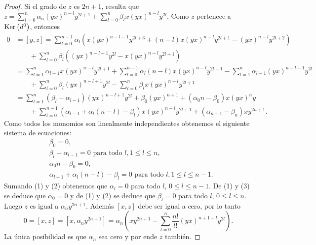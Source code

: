 \documentclass[fleqn,../tesis.tex]{subfiles}
\begin{document}
\begin{proof}
    Si el grado de $z$ es $2n + 1$, resulta que
    $z = \sum_{l = 0}^{n}\alpha_n (yx)^{n - l}y^{2l + 1} + \sum_{l = 0}^{n}\beta_l x (yx)^{n - l}y^{2l}$.
    Como $z$ pertenece a $\operatorname{Ker}\left(d^{0}\right)$, entonces
    \begin{align*}
        0 &= [y,z] = \sum_{l = 0}^{n - 1}\alpha_l \left(x (yx)^{n - l - 1}y^{2l + 3}
            + (n - l)x(yx)^{n - l}y^{2l + 1} - (yx)^{n - l}y^{2l + 2}\right) \\
        &\qquad + \sum_{l = 0}^{n}\beta_l\left((yx)^{n - l + 1}y^{2l} - x(yx)^{n - l}y^{2l + 1}\right)\\
        & = \sum_{l = 1}^{n}\alpha_{l - 1} x (yx)^{n - l}y^{2l + 1} + \sum_{l = 0}^{n - 1}\alpha_l (n - l)x(yx)^{n - l}y^{2l + 1}
           -\sum_{l = 1}^{n}\alpha_{l - 1}(yx)^{n - l + 1}y^{2l}\\
        &\qquad + \sum_{l = 0}^{n}\beta_l (yx)^{n - l + 1}y^{2l} -\sum_{l = 0}^{n}\beta_l x(yx)^{n - l}y^{2l + 1} \\
        &= \sum_{l = 1}^{n}\left(\beta_l - \alpha_{l - 1}\right)(yx)^{n - l + 1}y^{2l} + \beta_0 (yx)^{n + 1}
            + \left(\alpha_0 n - \beta_0\right)x(yx)^{n}y\\
        &\qquad + \sum_{l = 0}^{n - 1}\left(\alpha_{l - 1} + \alpha_l(n - l) - \beta_l\right)x(yx)^{n - l}y^{2l + 1}
            +\left(\alpha_{n - 1} - \beta_n \right)xy^{2n + 1}.
    \end{align*}
    Como todos los monomios son linealmente independientes obtenemos el siguiente sistema de ecuaciones:
    \begin{align}
        &\beta_0 = 0,\\
        &\beta_l - \alpha_{l - 1} = 0 \text{ para todo } l, 1 \leq l \leq n,\\
        &\alpha_0 n - \beta_0 = 0,\\
        &\alpha_{l - 1} +  \alpha_l(n - l) -\beta_l = 0 \text{ para todo } l, 1 \leq l \leq n - 1.
    \end{align}
    Sumando (1) y (2) obtenemos que $\alpha_l = 0$ para todo $l$, $0 \leq l \leq n - 1$. De (1) y (3) se deduce que $\alpha_0 = 0$
    y de (1) y (2) se deduce que $\beta_l = 0$ para todo $l$, $0\leq l \leq n$. Luego $z$ es igual a $\alpha_n y^{2n + 1}$. Además
    $[x, z]$ debe ser igual a cero, por lo tanto
    \[
        0 = [x, z] = [x, \alpha_n y^{2n + 1}] = \alpha_n \left(xy^{2n + 1} - \sum_{l = 0}^{n}\frac{n!}{l!}(yx)^{n + 1- l}y^{2l}\right).
    \]
    La única posibilidad es que $\alpha_n$ sea cero y por ende $z$ también.
\end{proof}
\end{document}
